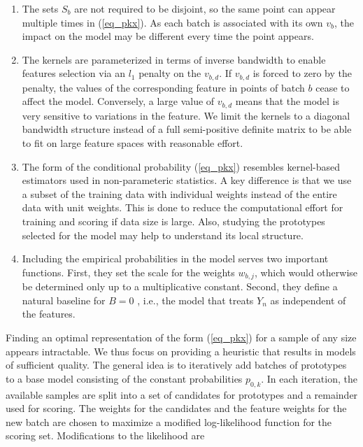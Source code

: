 %
\begin{remark}
\begin{enumerate}
\item The sets $S_b$ are not required to be disjoint, so the same point can appear multiple times in (\ref{eq_pkx}).
As each batch is associated with its own $v_b$, the impact on the model may be different every time the point appears.
%
\item The kernels are parameterized in terms of inverse bandwidth to enable features selection via an $l_1$ penalty on the $v_{b,d}$.
If $v_{b,d}$ is forced to zero by the penalty, the values of the corresponding feature in points of batch $b$ cease to affect the model.
Conversely, a large value of $v_{b,d}$ means that the model is very sensitive to variations in the feature.
We limit the kernels to a diagonal bandwidth structure instead of a full semi-positive definite matrix to be able to fit on large feature spaces with reasonable effort.
%
\item The form of the conditional probability (\ref{eq_pkx}) resembles kernel-based estimators used in non-parameteric statistics.
A key difference is that we use a subset of the training data with individual weights instead of the entire data with unit weights.
This is done to reduce the computational effort for training and scoring if data size is large.
Also, studying the prototypes selected for the model may help to understand its local structure.
%
\item Including the empirical probabilities in the model serves two important functions.
First, they set the scale for the weights $w_{b,j}$, which would otherwise be determined only up to a multiplicative constant.
Second, they define a natural baseline for $B=0$ , i.e., the model that treats $Y_n$ as independent of the features.
\end{enumerate}
\end{remark}
%
Finding an optimal representation of the form (\ref{eq_pkx}) for a sample of any size appears intractable.
We thus focus on providing a heuristic that results in models of sufficient quality.
The general idea is to iteratively add batches of prototypes to a base model consisting of the constant probabilities $p_{0,k}$.
In each iteration, the available samples are split into a set of candidates for prototypes and a remainder used for scoring.
The weights for the candidates and the feature weights for the new batch are chosen to maximize a modified log-likelihood function for the scoring set.
Modifications to the likelihood are
%
